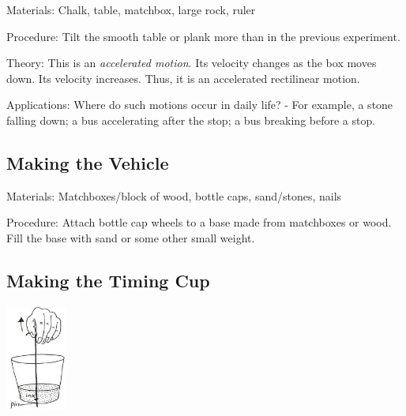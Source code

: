 \begin{multicols}{2}
\begin{description*}
\item[Materials:]{Chalk, table, matchbox, large rock, ruler}
\item[Procedure:]{Tilt the smooth table or plank more than in the previous experiment.}
\item[Theory:]{This is an \emph{accelerated motion}. Its velocity changes as the box moves down. Its
velocity increases. Thus, it is an accelerated rectilinear motion.}
\item[Applications:]{Where do such motions occur in daily life? - For example, a stone falling down; a bus
accelerating after the stop; a bus breaking before a stop.}
\end{description*}

\subsection{Making the Vehicle}

\begin{description*}
\item[Materials:]{Matchboxes/block of wood, bottle caps, sand/stones, nails}
\item[Procedure:]{Attach bottle cap wheels to a base made from matchboxes or wood. Fill the base with sand or some other small weight.}
\end{description*}

\subsection{Making the Timing Cup}

\begin{center}
\includegraphics[width=0.15\textwidth]{./img/vso/timing-cup.jpg}
\end{center}


\end{multicols}
